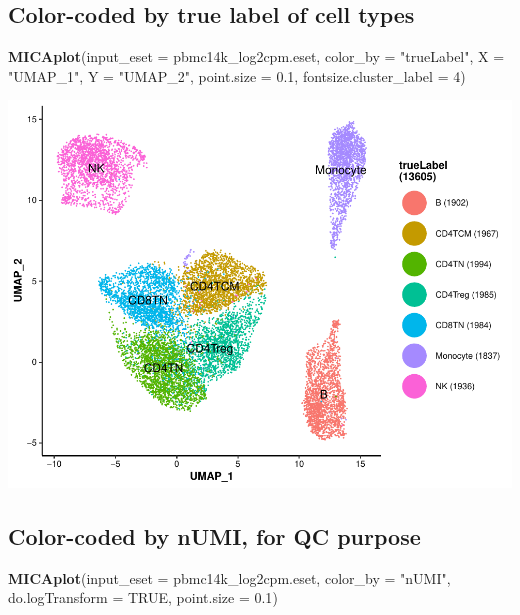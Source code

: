 \documentclass[
  12pt,
]{book}
\newenvironment{Shaded}{\begin{snugshade}}{\end{snugshade}}
\newcommand{\AttributeTok}[1]{\textcolor[rgb]{0.13,0.29,0.53}{#1}}
\newcommand{\ConstantTok}[1]{\textcolor[rgb]{0.56,0.35,0.01}{#1}}
\newcommand{\DecValTok}[1]{\textcolor[rgb]{0.00,0.00,0.81}{#1}}
\newcommand{\FloatTok}[1]{\textcolor[rgb]{0.00,0.00,0.81}{#1}}
\newcommand{\FunctionTok}[1]{\textcolor[rgb]{0.13,0.29,0.53}{\textbf{#1}}}
\newcommand{\NormalTok}[1]{#1}
\newcommand{\StringTok}[1]{\textcolor[rgb]{0.31,0.60,0.02}{#1}}
\begin{document}
\subsection{Color-coded by true label of cell types}\label{color-coded-by-true-label-of-cell-types}

\begin{Shaded}
\begin{Highlighting}[]
\FunctionTok{MICAplot}\NormalTok{(}\AttributeTok{input\_eset =}\NormalTok{ pbmc14k\_log2cpm.eset, }\AttributeTok{color\_by =} \StringTok{"trueLabel"}\NormalTok{, }\AttributeTok{X =} \StringTok{"UMAP\_1"}\NormalTok{, }\AttributeTok{Y =} \StringTok{"UMAP\_2"}\NormalTok{, }\AttributeTok{point.size =} \FloatTok{0.1}\NormalTok{, }\AttributeTok{fontsize.cluster\_label =} \DecValTok{4}\NormalTok{)}
\end{Highlighting}
\end{Shaded}

\begin{center}\includegraphics{_main_files/figure-latex/visualize-mica-output-truelabel-1} \end{center}

\subsection{Color-coded by nUMI, for QC purpose}\label{color-coded-by-numi-for-qc-purpose}

\begin{Shaded}
\begin{Highlighting}[]
\FunctionTok{MICAplot}\NormalTok{(}\AttributeTok{input\_eset =}\NormalTok{ pbmc14k\_log2cpm.eset, }\AttributeTok{color\_by =} \StringTok{"nUMI"}\NormalTok{, }\AttributeTok{do.logTransform =} \ConstantTok{TRUE}\NormalTok{, }\AttributeTok{point.size =} \FloatTok{0.1}\NormalTok{)}
\end{Highlighting}
\end{Shaded}
\end{document}
